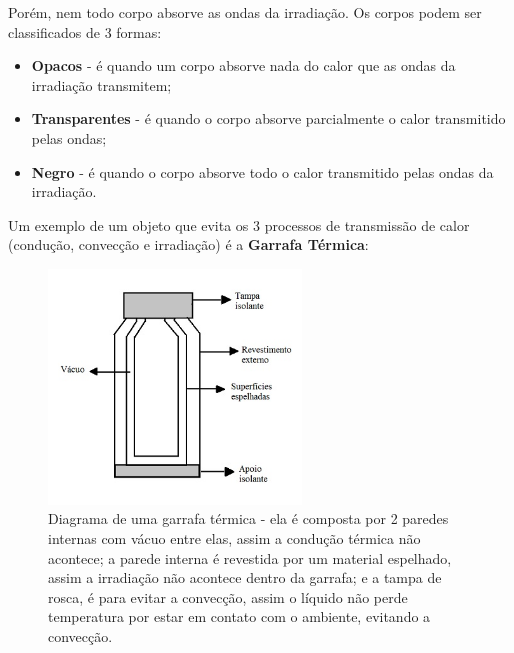 \documentclass[12pt]{extarticle}
\newcommand{\<}{\langle}
\renewcommand{\>}{\rangle}
\theoremstyle{definition}
\begin{document}
Porém, nem todo corpo absorve as ondas da irradiação. Os corpos podem ser classificados de 3 formas:
\begin{itemize}
    \item \textbf{Opacos} - é quando um corpo absorve nada do calor que as ondas da irradiação transmitem;
    \item \textbf{Transparentes} - é quando o corpo absorve parcialmente o calor transmitido pelas ondas;
    \item \textbf{Negro} - é quando o corpo absorve todo o calor transmitido pelas ondas da irradiação.
\end{itemize}

Um exemplo de um objeto que evita os 3 processos de transmissão de calor (condução, convecção e irradiação) é a \textbf{Garrafa Térmica}:

\begin{figure}[h]
    \centering
    \includegraphics[width=0.6\textwidth]{composição de uma garrafa térmica.jpg}
    \caption{Diagrama de uma garrafa térmica - ela é composta por 2 paredes internas com vácuo entre elas, assim a condução térmica não acontece; a parede interna é revestida por um material espelhado, assim a irradiação não acontece dentro da garrafa; e a tampa de rosca, é para evitar a convecção, assim o líquido não perde temperatura por estar em contato com o ambiente, evitando a convecção.}
    \label{fig:my_label}
\end{figure}
\end{document}
